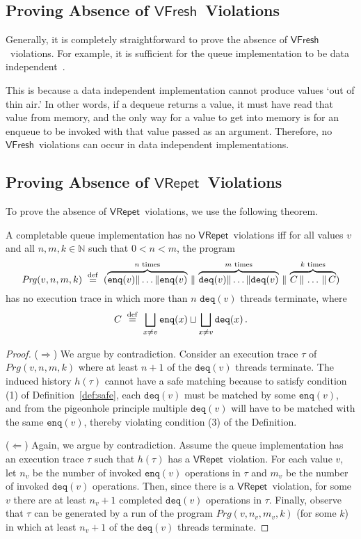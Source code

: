 \documentclass{LMCS}
\newcommand{\defeq}{\;\stackrel{\rm def}{=}\;}
\newcommand{\enq}{\ensuremath{\mathtt{enq}}}
\newcommand{\deq}{\ensuremath{\mathtt{deq}}}
\newcommand{\Prg}{\mathit{Prg}}
\newcommand{\ndchoice}{\sqcup}
\newcommand{\bigndchoice}{\bigsqcup}
\newcommand{\VFresh}{\ensuremath{\mathsf{VFresh}}}
\newcommand{\VRepet}{\ensuremath{\mathsf{VRepet}}}
\begin{document}
\subsection*{Proving Absence of \VFresh\ Violations}

Generally, it is completely straightforward to prove the absence of \VFresh\
violations.  For example, it is sufficient for the queue implementation to be
data independent~\cite{WP1986}.

This is because a data independent implementation cannot produce values `out of
thin air.' In other words, if a dequeue returns a value, it must have read that
value from memory, and the only way for a value to get into memory is for an
enqueue to be invoked with that value passed as an argument.  Therefore, no
\VFresh\ violations can occur in data independent implementations.




\subsection*{Proving Absence of \VRepet\ Violations}

To prove the absence of \VRepet\ violations, we use the following theorem. 

\begin{thm}\label{thm:vrepet}
A completable queue implementation has no \VRepet\ violations iff 
for all values $v$ and all $n,m,k \in \mathbb{N}$ such that $0 < n < m$, the program
\[
 \Prg(v,n,m,k) \defeq (\overbrace{\enq(v) \| \ldots \| \enq(v)}^{n\text{ times}} \,\|\,
                     \overbrace{\deq(v) \| \ldots \| \deq(v)}^{m\text{ times}} \,\|\, 
                     \overbrace{C \,\|\, \ldots \,\|\, C}^{k\text{ times}} )
\]
has no execution trace in which more than $n$ $\deq(v)$ threads terminate, where
\[
  C \defeq   
   \bigndchoice_{x\neq v} \enq(x) \ndchoice 
   \bigndchoice_{x\neq v} \deq(x)
\,.
\]
\end{thm}

\begin{proof}
($\Rightarrow$)
We argue by contradiction.
Consider an execution trace $\tau$ of $\Prg(v,n,m,k)$ where at least $n+1$ of the $\deq(v)$ threads terminate.
The induced history $h(\tau)$ cannot have a safe matching because to satisfy condition (1) of
Definition~\ref{def:safe}, each $\deq(v)$ must be matched by some $\enq(v)$,
and from the pigeonhole principle multiple $\deq(v)$ will have to be matched
with the same $\enq(v)$, 
thereby violating condition (3) of the Definition.

($\Leftarrow$)
Again, we argue by contradiction.
Assume the queue implementation has an execution trace $\tau$ such that $h(\tau)$ has a \VRepet\ violation. 
For each value $v$, 
let $n_v$ be the number of invoked $\enq(v)$ operations in $\tau$ 
and $m_v$ be the number of invoked $\deq(v)$ operations.
Then, since there is a \VRepet\ violation, for some $v$ there are at least 
$n_v + 1$ completed $\deq(v)$ operations in $\tau$.
Finally, observe that $\tau$ can be generated by a run of the program $\Prg(v,n_v,m_v,k)$
(for some $k$) in which at least $n_v + 1$ of the $\deq(v)$ threads terminate.
\end{proof}
\end{document}
